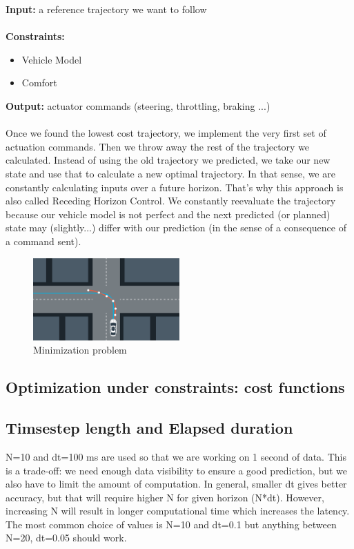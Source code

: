 \documentclass[11pt]{article}
\begin{document}
\textbf{Input:} a reference trajectory we want to follow \\ \\
\textbf{Constraints:}
\begin{itemize}
\item Vehicle Model
\item Comfort
\end{itemize}

\textbf{Output:} actuator commands (steering, throttling, braking ...)  \\ \\

Once we found the lowest cost trajectory, we implement the very first set of actuation commands. Then we throw away the rest of the trajectory we calculated. Instead of using the old trajectory we predicted, we take our new state and use that to calculate a new optimal trajectory. In that sense, we are constantly calculating inputs over a future horizon. That's why this approach is also called Receding Horizon Control. We constantly reevaluate the trajectory because our vehicle model is not perfect and the next predicted (or planned) state may (slightly...) differ with our prediction (in the sense of a consequence of a command sent). 


\begin{figure}[h]
    \centering
    \includegraphics[width=0.5\textwidth]{minimization}
    \caption{Minimization problem}
    \label{fig:minimization}
\end{figure} 

\subsection{Optimization under constraints: cost functions}

\subsection{Timsestep length and Elapsed duration}

N=10 and dt=100 ms are used so that we are working on 1 second of data.
This is a trade-off: we need enough data visibility to ensure a good prediction, but we also have to limit the amount of computation.
In general, smaller dt gives better accuracy, but that will require higher N for given horizon (N*dt). However, increasing N will result in longer computational time which increases the latency. The most common choice of values is N=10 and dt=0.1 but anything between N=20, dt=0.05 should work.
\end{document}
